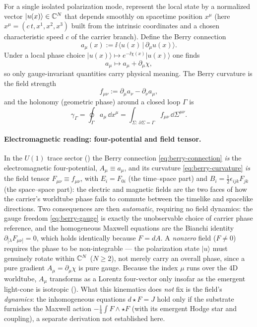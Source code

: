 For a single isolated polarization mode, represent the local state by a normalized vector
$\lvert u(x)\rangle\in\mathbb{C}^{N}$ that depends smoothly on spacetime position $x^\mu$
(here $x^\mu=(c\,t,x^1,x^2,x^3)$ built from the intrinsic coordinates and a chosen characteristic speed $c$ of the
carrier branch).
Define the Berry connection
\begin{equation}
  a_\mu(x) := \ii\,\langle u(x)\,|\,\partial_\mu u(x)\rangle.
  \label{eq:berry-connection}
\end{equation}
Under a local phase choice $\lvert u(x)\rangle\mapsto e^{-\ii\chi(x)}\lvert u(x)\rangle$ one finds
\begin{equation}
  a_\mu \mapsto a_\mu + \partial_\mu \chi,
  \label{eq:berry-gauge}
\end{equation}
so only gauge-invariant quantities carry physical meaning.
The Berry curvature is the field strength
\begin{equation}
  f_{\mu\nu} := \partial_\mu a_\nu - \partial_\nu a_\mu,
  \label{eq:berry-curvature}
\end{equation}
and the holonomy (geometric phase) around a closed loop $\Gamma$ is
\begin{equation}
  \gamma_\Gamma
  = \oint_\Gamma a_\mu\,\dd x^\mu
  = \int_{\Sigma:\,\partial\Sigma=\Gamma} f_{\mu\nu}\,\dd\Sigma^{\mu\nu}.
  \label{eq:berry-holonomy}
\end{equation}

\paragraph{Electromagnetic reading: four-potential and field tensor.}
In the $U(1)$ trace sector () the Berry connection
\eqref{eq:berry-connection} \emph{is} the electromagnetic four-potential, $A_\mu\equiv a_\mu$, and
its curvature \eqref{eq:berry-curvature} \emph{is} the field tensor $F_{\mu\nu}\equiv f_{\mu\nu}$,
with $E_i=F_{0i}$ (the time--space part) and $B_i=\tfrac12\epsilon_{ijk}F_{jk}$ (the space--space
part): the electric and magnetic fields are the two faces of how the carrier's worldtube phase fails
to commute between the timelike and spacelike directions.
Two consequences are then \emph{automatic}, requiring no field dynamics: the gauge freedom
\eqref{eq:berry-gauge} is exactly the unobservable choice of carrier phase reference, and the
homogeneous Maxwell equations are the Bianchi identity $\partial_{[\lambda}F_{\mu\nu]}=0$, which holds
identically because $F=dA$.
A \emph{nonzero} field ($F\neq0$) requires the phase to be non-integrable --- the polarization state
$\lvert u\rangle$ must genuinely rotate within $\mathbb{C}^{N}$ ($N\ge2$), not merely carry an overall phase,
since a pure gradient $A_\mu=\partial_\mu\chi$ is pure gauge.
Because the index $\mu$ runs over the 4D worldtube, $A_\mu$ transforms as a Lorentz four-vector only
insofar as the emergent light-cone is isotropic ().
What this kinematics does \emph{not} fix is the field's \emph{dynamics}: the inhomogeneous equations
$d{\star}F=J$ hold only if the substrate furnishes the Maxwell action $-\tfrac14\int F\wedge{\star}F$
(with its emergent Hodge star and coupling), a separate derivation not established here.

